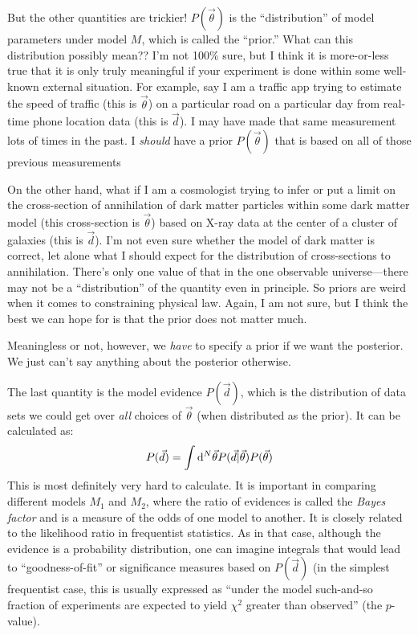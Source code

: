 But the other quantities are trickier! $P(\vec{\theta})$ is the
``distribution'' of model parameters under model $M$, which is called
the ``prior.'' What can this distribution possibly mean?? I'm not
100\% sure, but I think it is more-or-less true that it is only truly
meaningful if your experiment is done within some well-known external
situation. For example, say I am a traffic app trying to estimate the
speed of traffic (this is $\vec{\theta}$) on a particular road on a
particular day from real-time phone location data (this is $\vec{d}$).
I may have made that same measurement lots of times in the past. I
{\it should} have a prior $P(\vec{\theta})$ that is based on all of
those previous measurements

On the other hand, what if I am a cosmologist trying to infer or put a
limit on the cross-section of annihilation of dark matter particles
within some dark matter model (this cross-section is $\vec{\theta}$)
based on X-ray data at the center of a cluster of galaxies (this is
$\vec{d}$). I'm not even sure whether the model of dark matter is
correct, let alone what I should expect for the distribution of
cross-sections to annihilation. There's only one value of that in the
one observable universe---there may not be a ``distribution'' of the
quantity even in principle. So priors are weird when it comes to
constraining physical law. Again, I am not sure, but I think the best
we can hope for is that the prior does not matter much.

Meaningless or not, however, we {\it have} to specify a prior if we
want the posterior. We just can't say anything about the posterior
otherwise.

The last quantity is the model evidence $P(\vec{d})$, which is the
distribution of data sets we could get over {\it all} choices of
$\vec{\theta}$ (when distributed as the prior). It can be calculated
as:
\begin{equation}
P(\vec{d}) = \int {\rm d}^N\vec{\theta} P(\vec{d}| \vec{\theta} )
P(\vec{\theta})
\end{equation}
This is most definitely very hard to calculate. It is important in
comparing different models $M_1$ and $M_2$, where the ratio of
evidences is called the {\it Bayes factor} and is a measure of the
odds of one model to another. It is closely related to the likelihood
ratio in frequentist statistics. As in that case, although the
evidence is a probability distribution, one can imagine integrals that
would lead to ``goodness-of-fit'' or significance measures based on
$P(\vec{d})$ (in the simplest frequentist case, this is usually
expressed as ``under the model such-and-so fraction of experiments are
expected to yield $\chi^2$ greater than observed'' (the $p$-value).

